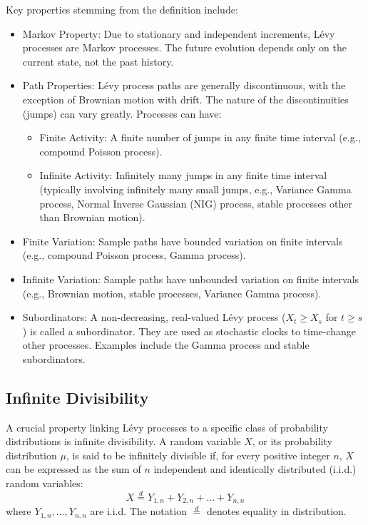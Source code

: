 \documentclass[11pt,twoside,openright]{report}
\begin{document}
Key properties stemming from the definition include:
\begin{itemize}
    \item Markov Property: Due to stationary and independent increments, Lévy processes are Markov processes. The future evolution depends only on the current state, not the past history.
    \item Path Properties: Lévy process paths are generally discontinuous, with the exception of Brownian motion with drift. The nature of the discontinuities (jumps) can vary greatly. Processes can have:
        \begin{itemize}
            \item Finite Activity: A finite number of jumps in any finite time interval (e.g., compound Poisson process).
            \item Infinite Activity: Infinitely many jumps in any finite time interval (typically involving infinitely many small jumps, e.g., Variance Gamma process, Normal Inverse Gaussian (NIG) process, stable processes other than Brownian motion).
        \end{itemize}
    \item Finite Variation: Sample paths have bounded variation on finite intervals (e.g., compound Poisson process, Gamma process).
    \item Infinite Variation: Sample paths have unbounded variation on finite intervals (e.g., Brownian motion, stable processes, Variance Gamma process).
    \item Subordinators: A non-decreasing, real-valued Lévy process ($X_t \ge X_s$ for $t \ge s$) is called a subordinator. They are used as stochastic clocks to time-change other processes. Examples include the Gamma process and stable subordinators.
\end{itemize}

\subsection{Infinite Divisibility}
\label{subsec:infinite_divisibility}

A crucial property linking Lévy processes to a specific class of probability distributions is infinite divisibility. A random variable $X$, or its probability distribution $\mu$, is said to be infinitely divisible if, for every positive integer $n$, $X$ can be expressed as the sum of $n$ independent and identically distributed (i.i.d.) random variables:
\begin{equation}
X \overset{d}{=} Y_{1,n} + Y_{2,n} + \dots + Y_{n,n}
\label{eq:infinite_divisibility}
\end{equation}
where $Y_{1,n}, \dots, Y_{n,n}$ are i.i.d. The notation $\overset{d}{=}$ denotes equality in distribution.
\end{document}
